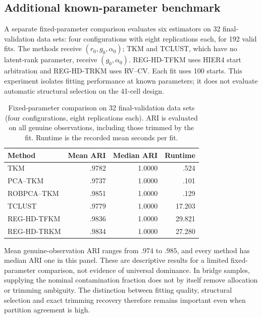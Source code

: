 \subsection{Additional known-parameter benchmark}

A separate fixed-parameter comparison evaluates six estimators on 32
final-validation data sets: four configurations with eight replications each,
for 192 valid fits. The methods receive $(r_0,g_0,\alpha_0)$; TKM and TCLUST,
which have no latent-rank parameter, receive $(g_0,\alpha_0)$. REG-HD-TFKM
uses HIER4 start arbitration and REG-HD-TRKM uses RV--CV. Each fit uses
100 starts. This experiment isolates fitting performance at known parameters;
it does not evaluate automatic structural selection on the 41-cell design.

\begin{table}[htbp]
\centering
\caption{Fixed-parameter comparison on 32 final-validation data sets
(four configurations, eight replications each). ARI is evaluated on all
 genuine observations, including those trimmed by the fit. Runtime is the
recorded mean seconds per fit.}
\label{tab:supp-competitors}
\small
\begin{tabular}{lrrr}
\toprule
Method & Mean ARI & Median ARI & Runtime\\
\midrule
TKM & .9782 & 1.0000 & .524\\
PCA--TKM & .9737 & 1.0000 & .101\\
ROBPCA--TKM & .9851 & 1.0000 & .129\\
TCLUST & .9779 & 1.0000 & 17.203\\
REG-HD-TFKM & .9836 & 1.0000 & 29.821\\
REG-HD-TRKM & .9834 & 1.0000 & 27.280\\
\bottomrule
\end{tabular}
\end{table}

Mean genuine-observation ARI ranges from $.974$ to $.985$, and every method
has median ARI one in this panel. These are descriptive results for a limited
fixed-parameter comparison, not evidence of universal dominance. In bridge
samples, supplying the nominal contamination fraction does not by itself
remove allocation or trimming ambiguity. The distinction between fitting
quality, structural selection and exact trimming recovery therefore remains
important even when partition agreement is high.


